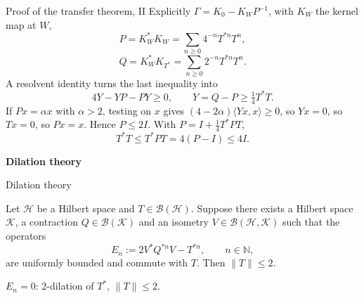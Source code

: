 \documentclass[14pt]{beamer}
\newcommand{\Hil}{\mathcal{H}}
\newcommand{\K}{\mathcal{K}}
\newcommand{\B}{\mathcal{B}}
\newcommand{\norm}[1]{\lVert #1\rVert}
\newcommand{\ip}[2]{\langle #1,#2\rangle}
\begin{document}
\begin{frame}{Proof of the transfer theorem, II}
  Explicitly $\Gamma=K_0-K_WP^{-1}$, with $K_W$ the kernel map at $W$,
  \[
    P=K_W^*K_W=\sum_{n\ge0}4^{-n}T^{*n}T^n,
  \]
  \[
    Q=K_W^*K_{T^*}=\sum_{n\ge0}2^{-n}T^{*n}T^n .
  \]
  A resolvent identity turns the last inequality into
  \[
    4Y-YP-PY\ge0,\qquad Y=Q-P\ge\tfrac14T^*T .
  \]
  If $Px=\alpha x$ with $\alpha>2$, testing on $x$ gives $(4-2\alpha)\ip{Yx}{x}\ge0$, so $Yx=0$, so $Tx=0$, so $Px=x$. Hence $P\le2I$. With $P=I+\tfrac14T^*PT$,
  \[
    T^*T\le T^*PT=4(P-I)\le4I .
  \]
\end{frame}

\begin{frame}
  \begin{center}
    {\LARGE\bfseries Dilation theory}
  \end{center}
\end{frame}
\note{}

\begin{frame}{Dilation theory}
  \begin{lemma}
    Let $\Hil$ be a Hilbert space and $T\in\B(\Hil)$. Suppose there exists a Hilbert space $\K$, a contraction $Q\in\B(\K)$ and an isometry $V\in\B(\Hil,\K)$ such that the operators
    \[
      E_n:=2V^*Q^{*n}V-T^{*n},\qquad n\in\mathbb N,
    \]
    are uniformly bounded and commute with $T$. Then $\norm{T}\le2$.
  \end{lemma}
  \medskip
  $E_n=0$: $2$-dilation of $T^*$, $\norm{T}\le2$.
\end{frame}
\end{document}
